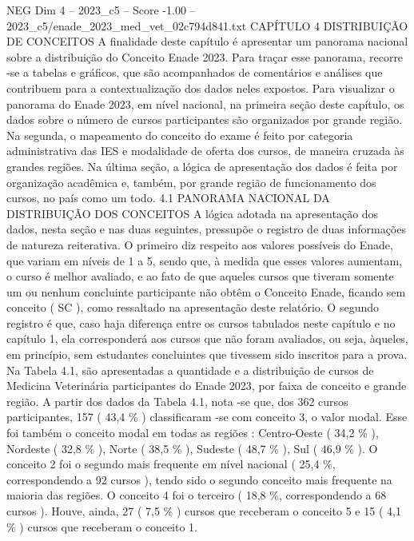 \begin{textsample}{NEG Dim 4 – 2023\_c5 – Score -1.00 – 2023\_c5/enade\_2023\_med\_vet\_02c794d841.txt}  \label{ex:f4_neg_098}
CAPÍTULO 4 DISTRIBUIÇÃO DE CONCEITOS A finalidade deste capítulo é apresentar um panorama nacional sobre a distribuição do Conceito Enade 2023.
Para traçar esse panorama, recorre -se a tabelas e gráficos, que são acompanhados de comentários e análises que contribuem para a contextualização dos dados neles expostos.
Para visualizar o panorama do Enade 2023, em nível nacional, na primeira seção deste capítulo, os dados sobre o número de cursos participantes são organizados por grande região.
Na segunda, o mapeamento do conceito do exame é feito por categoria administrativa das IES e modalidade de oferta dos cursos, de maneira cruzada às grandes regiões.
Na última seção, a lógica de apresentação dos dados é feita por organização acadêmica e, também, por grande região de funcionamento dos cursos, no país como um todo. 4.1 PANORAMA NACIONAL DA DISTRIBUIÇÃO DOS CONCEITOS A lógica adotada na apresentação dos dados, nesta seção e nas duas seguintes, pressupõe o registro de duas informações de natureza reiterativa.
O primeiro diz respeito aos valores possíveis do Enade, que variam em níveis de 1 a 5, sendo que, à medida que esses valores aumentam, o curso é melhor avaliado, e ao fato de que aqueles cursos que tiveram somente um ou nenhum concluinte participante não obtêm o Conceito Enade, ficando sem conceito ( SC ), como ressaltado na apresentação deste relatório.
O segundo registro é que, caso haja diferença entre os cursos tabulados neste capítulo e no capítulo 1, ela corresponderá aos cursos que não foram avaliados, ou seja, àqueles, em princípio, sem estudantes concluintes que tivessem sido inscritos para a prova.
Na Tabela 4.1, são apresentadas a quantidade e a distribuição de cursos de Medicina Veterinária participantes do Enade 2023, por faixa de conceito e grande região.
A partir dos dados da Tabela 4.1, nota -se que, dos 362 cursos participantes, 157 ( 43,4 \% ) classificaram -se com conceito 3, o valor modal.
Esse foi também o conceito modal em todas as regiões : Centro-Oeste ( 34,2 \% ), Nordeste ( 32,8 \% ), Norte ( 38,5 \% ), Sudeste ( 48,7 \% ), Sul ( 46,9 \% ).
O conceito 2 foi o segundo mais frequente em nível nacional ( 25,4 \%, correspondendo a 92 cursos ), tendo sido o segundo conceito mais frequente na maioria das regiões.
O conceito 4 foi o terceiro ( 18,8 \%, correspondendo a 68 cursos ).
Houve, ainda, 27 ( 7,5 \% ) cursos que receberam o conceito 5 e 15 ( 4,1 \% ) cursos que receberam o conceito 1.

\end{textsample}
